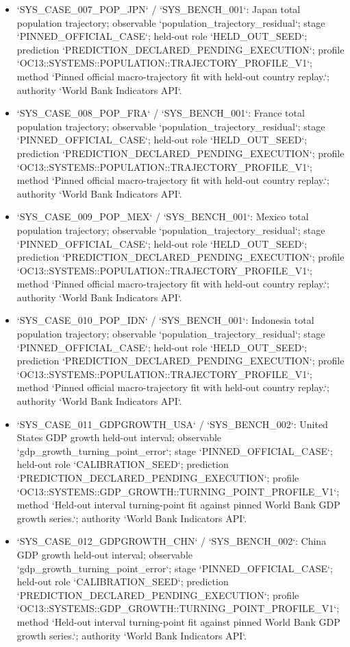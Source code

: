 \begin{itemize}
\item `SYS\_CASE\_007\_POP\_JPN` / `SYS\_BENCH\_001`: Japan total population trajectory; observable `population\_trajectory\_residual`; stage `PINNED\_OFFICIAL\_CASE`; held-out role `HELD\_OUT\_SEED`; prediction `PREDICTION\_DECLARED\_PENDING\_EXECUTION`; profile `OC13::SYSTEMS::POPULATION::TRAJECTORY\_PROFILE\_V1`; method `Pinned official macro-trajectory fit with held-out country replay.`; authority `World Bank Indicators API`.
\item `SYS\_CASE\_008\_POP\_FRA` / `SYS\_BENCH\_001`: France total population trajectory; observable `population\_trajectory\_residual`; stage `PINNED\_OFFICIAL\_CASE`; held-out role `HELD\_OUT\_SEED`; prediction `PREDICTION\_DECLARED\_PENDING\_EXECUTION`; profile `OC13::SYSTEMS::POPULATION::TRAJECTORY\_PROFILE\_V1`; method `Pinned official macro-trajectory fit with held-out country replay.`; authority `World Bank Indicators API`.
\item `SYS\_CASE\_009\_POP\_MEX` / `SYS\_BENCH\_001`: Mexico total population trajectory; observable `population\_trajectory\_residual`; stage `PINNED\_OFFICIAL\_CASE`; held-out role `HELD\_OUT\_SEED`; prediction `PREDICTION\_DECLARED\_PENDING\_EXECUTION`; profile `OC13::SYSTEMS::POPULATION::TRAJECTORY\_PROFILE\_V1`; method `Pinned official macro-trajectory fit with held-out country replay.`; authority `World Bank Indicators API`.
\item `SYS\_CASE\_010\_POP\_IDN` / `SYS\_BENCH\_001`: Indonesia total population trajectory; observable `population\_trajectory\_residual`; stage `PINNED\_OFFICIAL\_CASE`; held-out role `HELD\_OUT\_SEED`; prediction `PREDICTION\_DECLARED\_PENDING\_EXECUTION`; profile `OC13::SYSTEMS::POPULATION::TRAJECTORY\_PROFILE\_V1`; method `Pinned official macro-trajectory fit with held-out country replay.`; authority `World Bank Indicators API`.
\item `SYS\_CASE\_011\_GDPGROWTH\_USA` / `SYS\_BENCH\_002`: United States GDP growth held-out interval; observable `gdp\_growth\_turning\_point\_error`; stage `PINNED\_OFFICIAL\_CASE`; held-out role `CALIBRATION\_SEED`; prediction `PREDICTION\_DECLARED\_PENDING\_EXECUTION`; profile `OC13::SYSTEMS::GDP\_GROWTH::TURNING\_POINT\_PROFILE\_V1`; method `Held-out interval turning-point fit against pinned World Bank GDP growth series.`; authority `World Bank Indicators API`.
\item `SYS\_CASE\_012\_GDPGROWTH\_CHN` / `SYS\_BENCH\_002`: China GDP growth held-out interval; observable `gdp\_growth\_turning\_point\_error`; stage `PINNED\_OFFICIAL\_CASE`; held-out role `CALIBRATION\_SEED`; prediction `PREDICTION\_DECLARED\_PENDING\_EXECUTION`; profile `OC13::SYSTEMS::GDP\_GROWTH::TURNING\_POINT\_PROFILE\_V1`; method `Held-out interval turning-point fit against pinned World Bank GDP growth series.`; authority `World Bank Indicators API`.

\end{itemize}
